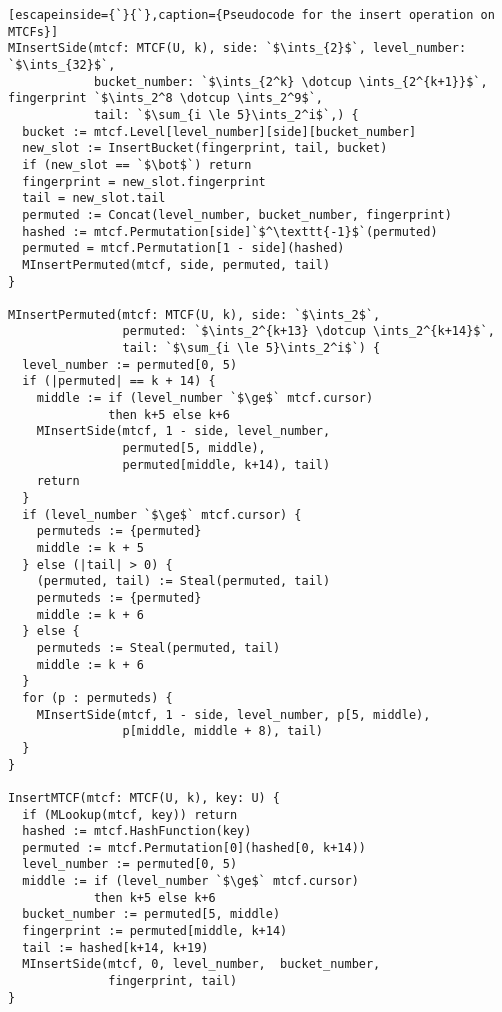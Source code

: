 \documentclass[sigconf, nonacm]{acmart}
\newcommand{\ints}{\mathbb{Z}}
\newcommand{\dotcup}{\ensuremath{\mathaccent\cdot\cup}}
\begin{document}
\begin{lstlisting}[escapeinside={`}{`},caption={Pseudocode for the insert operation on MTCFs}]
MInsertSide(mtcf: MTCF(U, k), side: `$\ints_{2}$`, level_number: `$\ints_{32}$`,
            bucket_number: `$\ints_{2^k} \dotcup \ints_{2^{k+1}}$`, fingerprint `$\ints_2^8 \dotcup \ints_2^9$`,
            tail: `$\sum_{i \le 5}\ints_2^i$`,) {
  bucket := mtcf.Level[level_number][side][bucket_number]
  new_slot := InsertBucket(fingerprint, tail, bucket)
  if (new_slot == `$\bot$`) return
  fingerprint = new_slot.fingerprint
  tail = new_slot.tail
  permuted := Concat(level_number, bucket_number, fingerprint)
  hashed := mtcf.Permutation[side]`$^\texttt{-1}$`(permuted)
  permuted = mtcf.Permutation[1 - side](hashed)
  MInsertPermuted(mtcf, side, permuted, tail)
}

MInsertPermuted(mtcf: MTCF(U, k), side: `$\ints_2$`,
                permuted: `$\ints_2^{k+13} \dotcup \ints_2^{k+14}$`,
                tail: `$\sum_{i \le 5}\ints_2^i$`) {
  level_number := permuted[0, 5)
  if (|permuted| == k + 14) {
    middle := if (level_number `$\ge$` mtcf.cursor)
              then k+5 else k+6
    MInsertSide(mtcf, 1 - side, level_number,
                permuted[5, middle),
                permuted[middle, k+14), tail)
    return
  }
  if (level_number `$\ge$` mtcf.cursor) {
    permuteds := {permuted}
    middle := k + 5
  } else (|tail| > 0) {
    (permuted, tail) := Steal(permuted, tail)
    permuteds := {permuted}
    middle := k + 6
  } else {
    permuteds := Steal(permuted, tail)
    middle := k + 6
  }
  for (p : permuteds) {
    MInsertSide(mtcf, 1 - side, level_number, p[5, middle),
                p[middle, middle + 8), tail)
  }
}

InsertMTCF(mtcf: MTCF(U, k), key: U) {
  if (MLookup(mtcf, key)) return
  hashed := mtcf.HashFunction(key)
  permuted := mtcf.Permutation[0](hashed[0, k+14))
  level_number := permuted[0, 5)
  middle := if (level_number `$\ge$` mtcf.cursor)
            then k+5 else k+6
  bucket_number := permuted[5, middle)
  fingerprint := permuted[middle, k+14)
  tail := hashed[k+14, k+19)
  MInsertSide(mtcf, 0, level_number,  bucket_number,
              fingerprint, tail)
}
\end{lstlisting}

\end{document}
